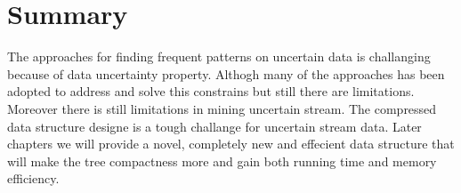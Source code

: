 \section{Summary}
The approaches for finding frequent patterns on uncertain data is challanging because of data uncertainty property. Althogh many of the approaches has been adopted to address and solve this constrains but still there are limitations. Moreover there is still limitations in mining uncertain stream. The compressed data structure designe is a tough challange for uncertain stream data. Later chapters we will provide a novel, completely new and effecient data structure that will make the tree compactness more and gain both running time and memory efficiency.
%